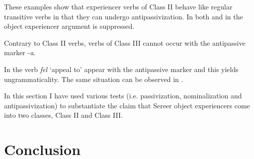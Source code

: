 \documentclass[output=paper]{langscibook}
\begin{document}
These examples show that experiencer verbs of Class II behave like regular transitive verbs in that they can undergo antipassivization. In both  and in  the object experiencer argument is suppressed.

Contrary to Class II verbs, verbs of Class III cannot occur with the antipassive marker -\textit{a}.

\ea \label{ex:tamba:22}
 \label{ex:tamba:22b}
\z
\z
      
In  the verb  \textit{fel} `appeal to'  appear with the antipassive marker and this yields ungrammaticality. The same situation can be observed in .

\ea \label{ex:tamba:23}
 \label{ex:tamba:23a}
\label{ex:tamba:23b}
\z
\z
              
In this section I have used various tests (i.e. passivization, nominalization and antipassivization) to substantiate the claim that Sereer object experiencers come into two classes, Class II and Class III. 

\section{Conclusion}
\end{document}
